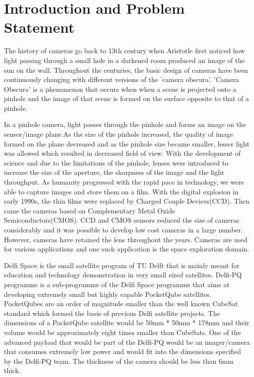 \chapter{Introduction and Problem Statement}
\label{chp:introduction}
The history of cameras go back to 13th century when Aristotle first noticed how light passing through a small hole in a darkened room produced an image of the sun on the wall. 
Throughout the centuries, the basic design of cameras have been continuously changing with  different versions of the 'camera obscura'. 'Camera Obscura' is a phenomenon that occurs when when a scene is projected onto a pinhole and the image of that scene is formed on the surface opposite to that of a pinhole. 

In a pinhole camera, light passes through the pinhole and forms an image on the sensor/image plane.As the size of the pinhole increased, the quality of image formed on the plane decreased and as the pinhole size became smaller, lesser light was allowed which resulted in decreased field of view. With the development of science and due to the limitations of the pinhole, lenses were introduced to increase the size of the aperture, the sharpness of the image and the light throughput. As humanity progressed with the rapid pace in technology, we were able to capture images and store them on a film. With the digital explosion in early 1990s, the thin films were replaced by Charged Couple Devices(CCD). Then came the cameras based on Complementary Metal Oxide Semiconductors(CMOS). CCD and CMOS sensors reduced the size of cameras considerably and it was possible to develop low cost cameras in a large number. However, cameras have retained the lens throughout the years. Cameras are used for various applications and one such application is the space exploration domain. 

Delfi Space is the small satellite program of TU Delft that is mainly meant for education and technology demonstration in very small sized satellites. Delfi-PQ programme is a sub-programme of the Delfi Space programme that aims at developing extremely small but highly capable PocketQube satellites. PocketQubes are an order of magnitude smaller than the well known CubeSat standard which formed the basis of previous Delfi satellite projects. The dimensions of a PocketQube satellite would be 50mm * 50mm * 178mm and their volume would be approximately eight times smaller than CubeSats. One of the advanced payload that would be part of the Delfi-PQ would be an imager/camera that consumes extremely low power and would fit into the dimensions specified by the Delfi-PQ team. The thickness of the camera should be less than 6mm thick.
 
